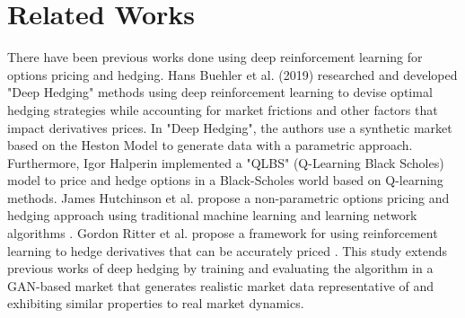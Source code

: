 \section{Related Works}

There have been previous works done using deep reinforcement learning for options pricing and hedging. Hans Buehler et al. (2019) researched and developed "Deep Hedging" \cite{deep-hedging} methods using deep reinforcement learning to devise optimal hedging strategies while accounting for market frictions and other factors that impact derivatives prices. In "Deep Hedging", the authors use a synthetic market based on the Heston Model \cite{heston} to generate data with a parametric approach. Furthermore, Igor Halperin implemented a "QLBS" (Q-Learning Black Scholes) \cite{qlbs} model to price and hedge options in a Black-Scholes world based on Q-learning methods. James Hutchinson et al. propose a non-parametric options pricing and hedging approach using traditional machine learning and learning network algorithms \cite{learning-network}. Gordon Ritter et al. propose a framework for using reinforcement learning to hedge derivatives that can be accurately priced \cite{dynamic-replication}. This study extends previous works of deep hedging by training and evaluating the algorithm in a GAN-based market that generates realistic market data representative of and exhibiting similar properties to real market dynamics.